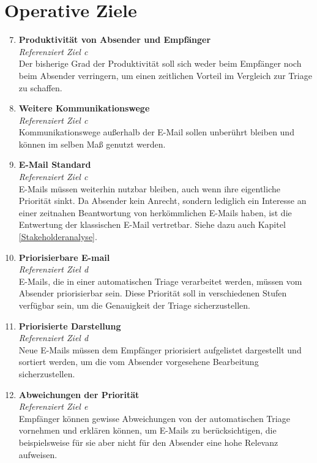 \section{Operative Ziele}
\begin{enumerate}[label=(\alph*)]
\setcounter{enumi}{6}
    \item \textbf{Produktivität von Absender und Empfänger}\\
    \textit{Referenziert Ziel c} \\
        Der bisherige Grad der Produktivität soll sich weder beim Empfänger noch beim Absender verringern, um einen zeitlichen Vorteil im Vergleich zur Triage zu schaffen. 
        
    \item \textbf{Weitere Kommunikationswege}\\
    \textit{Referenziert Ziel c} \\
        Kommunikationswege außerhalb der E-Mail sollen unberührt bleiben und können im selben Maß genutzt werden. 
        
    \item \textbf{E-Mail Standard}\\
    \textit{Referenziert Ziel c} \\
        E-Mails müssen weiterhin nutzbar bleiben, auch wenn ihre eigentliche Priorität sinkt. Da Absender kein Anrecht, sondern lediglich ein Interesse an einer zeitnahen Beantwortung von herkömmlichen E-Mails haben, ist die Entwertung der klassischen E-Mail vertretbar. Siehe dazu auch Kapitel \ref{Stakeholderanalyse}.
    
    \item \textbf{Priorisierbare E-mail}\\
    \textit{Referenziert Ziel d} \\
        E-Mails, die in einer automatischen Triage verarbeitet werden, müssen vom Absender priorisierbar sein. Diese Priorität soll in verschiedenen Stufen verfügbar sein, um die Genauigkeit der Triage sicherzustellen.
        
    \item \textbf{Priorisierte Darstellung}\\
    \textit{Referenziert Ziel d} \\
        Neue E-Mails müssen dem Empfänger priorisiert aufgelistet dargestellt und sortiert werden, um die vom Absender vorgesehene Bearbeitung sicherzustellen. 
        
    \item \textbf{Abweichungen der Priorität}\\
    \textit{Referenziert Ziel e} \\
        Empfänger können gewisse Abweichungen von der automatischen Triage vornehmen und erklären können, um E-Mails zu berücksichtigen, die beispielsweise für sie aber nicht für den Absender eine hohe Relevanz aufweisen.
        

\end{enumerate}
